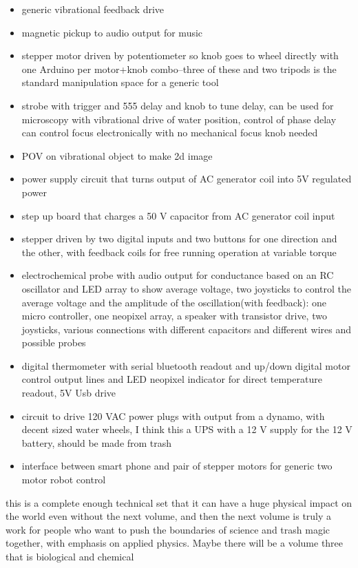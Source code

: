 \begin{itemize}
\tightlist
\item
  generic vibrational feedback drive
\item
  magnetic pickup to audio output for music
\item
  stepper motor driven by potentiometer so knob goes to wheel directly
  with one Arduino per motor+knob combo--three of these and two tripods
  is the standard manipulation space for a generic tool
\item
  strobe with trigger and 555 delay and knob to tune delay, can be used
  for microscopy with vibrational drive of water position, control of
  phase delay can control focus electronically with no mechanical focus
  knob needed
\item
  POV on vibrational object to make 2d image
\item
  power supply circuit that turns output of AC generator coil into 5V
  regulated power
\item
  step up board that charges a 50 V capacitor from AC generator coil
  input
\item
  stepper driven by two digital inputs and two buttons for one direction
  and the other, with feedback coils for free running operation at
  variable torque
\item
  electrochemical probe with audio output for conductance based on an RC
  oscillator and LED array to show average voltage, two joysticks to
  control the average voltage and the amplitude of the oscillation(with
  feedback): one micro controller, one neopixel array, a speaker with
  transistor drive, two joysticks, various connections with different
  capacitors and different wires and possible probes
\item
  digital thermometer with serial bluetooth readout and up/down digital
  motor control output lines and LED neopixel indicator for direct
  temperature readout, 5V Usb drive
\item
  circuit to drive 120 VAC power plugs with output from a dynamo, with
  decent sized water wheels, I think this a UPS with a 12 V supply for
  the 12 V battery, should be made from trash
\item
  interface between smart phone and pair of stepper motors for generic
  two motor robot control
\end{itemize}

this is a complete enough technical set that it can have a huge physical
impact on the world even without the next volume, and then the next
volume is truly a work for people who want to push the boundaries of
science and trash magic together, with emphasis on applied physics.
Maybe there will be a volume three that is biological and chemical

